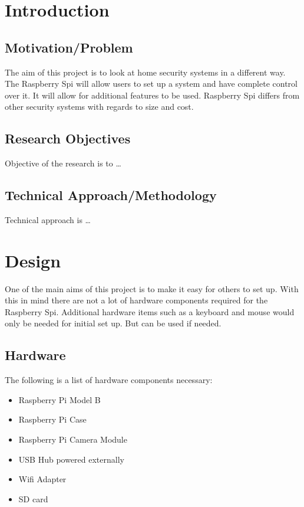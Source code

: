 \documentclass[]{report}
\begin{document}
\tableofcontents
\chapter {Introduction}
\label {ch:intro} 

\section {Motivation/Problem}
\label {sec:motprob}
The aim of this project is to look at home security systems in a different way. The Raspberry Spi will allow users to set up a system and have complete control over it. It will allow for additional features to be used. 
Raspberry Spi differs from other security systems with regards to size and cost. 
% 
\section {Research Objectives}
\label {sec:researchobj}
Objective of the research is to \ldots
\section {Technical Approach/Methodology}
\label {sec:tech}
Technical approach is \ldots
% 
\chapter {Design}
\label {ch:design}
	One of the main aims of this project is to make it easy for others to set up. With this in mind there are not a lot of hardware components required for the Raspberry Spi. Additional hardware items such as a keyboard and mouse would only be needed for initial set up. But can be used if needed. \\
	
\section {Hardware}	
\label {sec:hardware}

The following is a list of hardware components necessary:\\
\begin {itemize}
  \item Raspberry Pi Model B
  \item Raspberry Pi Case
  \item Raspberry Pi Camera Module
  \item USB Hub powered externally
  \item Wifi Adapter
  \item SD card
\end {itemize} 
\end{document}

